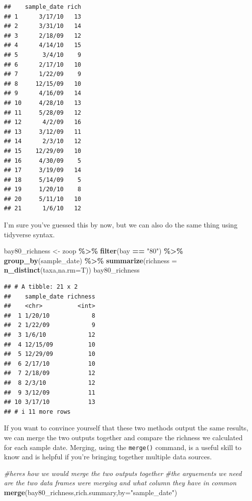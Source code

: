 \documentclass[
]{article}
\newenvironment{Shaded}{\begin{snugshade}}{\end{snugshade}}
\newcommand{\AttributeTok}[1]{\textcolor[rgb]{0.13,0.29,0.53}{#1}}
\newcommand{\CommentTok}[1]{\textcolor[rgb]{0.56,0.35,0.01}{\textit{#1}}}
\newcommand{\FunctionTok}[1]{\textcolor[rgb]{0.13,0.29,0.53}{\textbf{#1}}}
\newcommand{\NormalTok}[1]{#1}
\newcommand{\OtherTok}[1]{\textcolor[rgb]{0.56,0.35,0.01}{#1}}
\newcommand{\SpecialCharTok}[1]{\textcolor[rgb]{0.81,0.36,0.00}{\textbf{#1}}}
\newcommand{\StringTok}[1]{\textcolor[rgb]{0.31,0.60,0.02}{#1}}
\begin{document}
\begin{verbatim}
##    sample_date rich
## 1      3/17/10   13
## 2      3/31/10   14
## 3      2/18/09   12
## 4      4/14/10   15
## 5       3/4/10    9
## 6      2/17/10   10
## 7      1/22/09    9
## 8     12/15/09   10
## 9      4/16/09   14
## 10     4/28/10   13
## 11     5/28/09   12
## 12      4/2/09   16
## 13     3/12/09   11
## 14      2/3/10   12
## 15    12/29/09   10
## 16     4/30/09    5
## 17     3/19/09   14
## 18     5/14/09    5
## 19     1/20/10    8
## 20     5/11/10   10
## 21      1/6/10   12
\end{verbatim}

I'm sure you've guessed this by now, but we can also do the same thing
using tidyverse syntax.

\begin{Shaded}
\begin{Highlighting}[]
\NormalTok{bay80\_richness }\OtherTok{\textless{}{-}}\NormalTok{ zoop }\SpecialCharTok{\%\textgreater{}\%} 
  \FunctionTok{filter}\NormalTok{(bay }\SpecialCharTok{==} \StringTok{"80"}\NormalTok{) }\SpecialCharTok{\%\textgreater{}\%}
  \FunctionTok{group\_by}\NormalTok{(sample\_date) }\SpecialCharTok{\%\textgreater{}\%}
  \FunctionTok{summarize}\NormalTok{(}\AttributeTok{richness =} \FunctionTok{n\_distinct}\NormalTok{(taxa,}\AttributeTok{na.rm=}\NormalTok{T))}
\NormalTok{bay80\_richness}
\end{Highlighting}
\end{Shaded}

\begin{verbatim}
## # A tibble: 21 x 2
##    sample_date richness
##    <chr>          <int>
##  1 1/20/10            8
##  2 1/22/09            9
##  3 1/6/10            12
##  4 12/15/09          10
##  5 12/29/09          10
##  6 2/17/10           10
##  7 2/18/09           12
##  8 2/3/10            12
##  9 3/12/09           11
## 10 3/17/10           13
## # i 11 more rows
\end{verbatim}

If you want to convince yourself that these two methods output the same
results, we can merge the two outputs together and compare the richness
we calculated for each sample date. Merging, using the \texttt{merge()}
command, is a useful skill to know and is helpful if you're bringing
together multiple data sources.

\begin{Shaded}
\begin{Highlighting}[]
\CommentTok{\#here\textquotesingle{}s how we would merge the two outputs together}
\CommentTok{\#the arguements we need are the two data frames we\textquotesingle{}re merging and what column they have in common}
\FunctionTok{merge}\NormalTok{(bay80\_richness,rich.summary,}\AttributeTok{by=}\StringTok{"sample\_date"}\NormalTok{)}
\end{Highlighting}
\end{Shaded}
\end{document}
